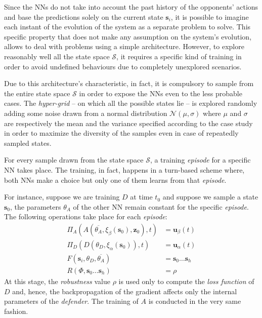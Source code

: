 Since the NNs do not take into account the past history of the opponents' actions and base the predictions solely on the current state $\textbf{s}_i$, it is possible to imagine each instant of the evolution of the system as a separate problem to solve.
This specific property that does not make any assumption on the system's evolution, allows to deal with problems using a simple architecture.
However, to explore reasonably well all the state space $\mathcal{S}$, it requires a specific kind of training in order to avoid undefined behaviours due to completely unexplored scenarios.

Due to this architecture's characteristic, in fact, it is compulsory to sample from the entire state space $\mathcal{S}$ in order to expose the NNs even to the less probable cases.
The \textit{hyper-grid} -- on which all the possible states lie -- is explored randomly adding some noise drawn from a normal distribution $\mathcal{N}(\mu, \sigma)$ where $\mu$ and $\sigma$ are respectively the mean and the variance specified according to the case study in order to maximize the diversity of the samples even in case of repeatedly sampled states.

For every sample drawn from the state space $\mathcal{S}$, a training \textit{episode} for a specific NN takes place.
The training, in fact, happens in a turn-based scheme where, both NNs make a choice but only one of them learns from that \textit{episode}.

For instance, suppose we are training $D$ at time $t_0$ and suppose we sample a state $\textbf{s}_0$, the parameters $\theta_A$ of the other NN remain constant for the specific \textit{episode}.
The following operations take place for each \textit{episode}:
\begin{align*}
 \Pi_A(A(\overline{\theta_A}, \xi_\beta(\textbf{s}_0), \textbf{z}_0), t) & = \textbf{u}_\beta(t) \\
 \Pi_D(D(\theta_D,  \xi_\alpha(\textbf{s}_0)), t) & = \textbf{u}_\alpha(t) \\
F(\textbf{s}_i, \theta_D, \overline{\theta_A}) & = \textbf{s}_0 \dots \textbf{s}_h \\
R(\Phi,  \textbf{s}_0 \dots \textbf{s}_h) & = \rho
\end{align*}
At this stage, the \textit{robustness} value $\rho$ is used only to compute the \textit{loss function} of $D$ and, hence, the backpropagation of the gradient affects only the internal parameters of the \textit{defender}.
The training of $A$ is conducted in the very same fashion.

